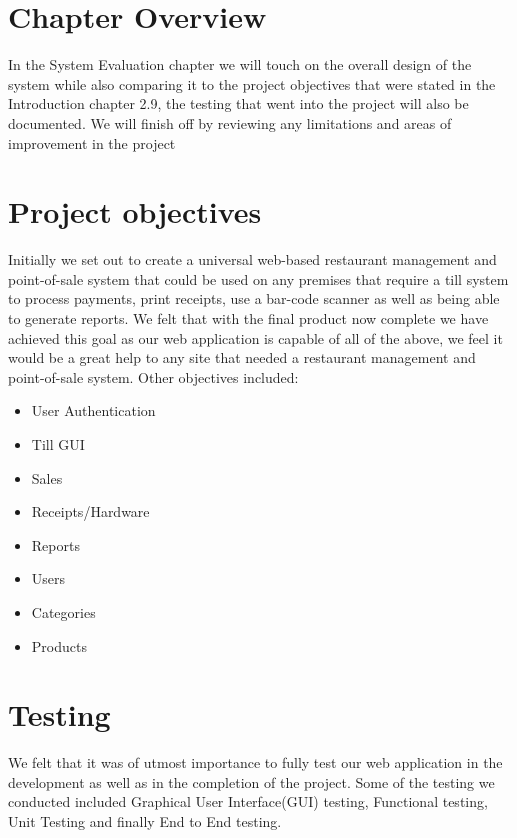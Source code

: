 \section{Chapter Overview}

In the System Evaluation chapter we will touch on the overall design of the system while also comparing it to the project objectives that were stated in the Introduction chapter 2.9, the testing that went into the project will also be documented. We will finish off by reviewing any limitations and areas of improvement in the project 

\section{Project objectives}

Initially we set out to create a universal web-based restaurant management and point-of-sale system that could be used on any premises that require a till system to process payments, print receipts, use a bar-code scanner as well as being able to generate reports. We felt that with the final product now complete we have achieved this goal as our web application is capable of all of the above, we feel it would be a great help to any site that needed a restaurant management and point-of-sale system. Other objectives included:

\begin{itemize}
  \item User Authentication
  \item Till GUI
  \item Sales
  \item Receipts/Hardware
  \item Reports
  \item Users
  \item Categories
  \item Products
  
\end{itemize}

\section{Testing}

We felt that it was of utmost importance to fully test our web application in the development as well as in the completion of the project. Some of the testing we conducted included Graphical User Interface(GUI) testing, Functional testing, Unit Testing and finally End to End testing.

